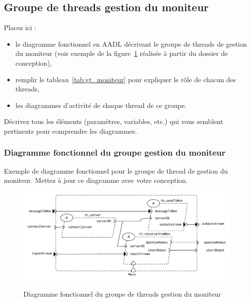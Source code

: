 \documentclass[11pt, a4paper]{paper}
\begin{document}
\subsection{Groupe de threads gestion du moniteur}

{\color{red}Placez ici :
\begin{itemize}
\item le diagramme fonctionnel en AADL décrivant le groupe de threads de gestion du moniteur (voir exemple de la figure~\ref{fig:diag_fonc_moniteur} réalisée à partir du dossier de conception),
\item remplir le tableau~\ref{tab:gt_moniteur} pour expliquer le rôle de chacun des threads,
\item les diagrammes d'activité de chaque thread de ce groupe.
\end{itemize}

Décrivez tous les éléments (paramètres, variables, etc.) qui vous semblent pertinents pour comprendre les diagrammes.}

\subsubsection{Diagramme fonctionnel du groupe gestion du moniteur}

{\color{red} Exemple de diagramme fonctionnel pour le groupe de thread de gestion du moniteur. Mettez à jour ce diagramme avec votre conception.}

\begin{figure}[htbp]
\label{fig:diag_fonc_moniteur}
\begin{center}
{\includegraphics[scale=.5]{./figures-pdf/diag_fonc_moniteur}}
{\caption{Diagramme fonctionnel du groupe de threads gestion du moniteur}}
\end{center}
\end{figure}
\FloatBarrier
\end{document}
